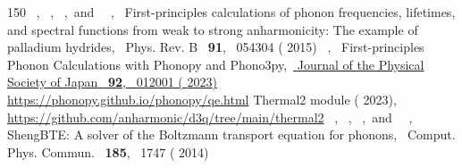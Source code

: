 \documentclass[
prb,
twocolumn,
superscriptaddress,
 amsmath,amssymb,
 aps,
longbibliography,
]{revtex4-2}
\begin{document}
\begin{thebibliography}{150}
  \BibitemOpen
   { {~},  {~},  {~},\ and\  {~},\ } { {First-principles calculations of phonon frequencies, lifetimes, and spectral functions from weak to strong anharmonicity: The example of palladium hydrides},\ }\href@noop {} { { {Phys. Rev. B}\ }\textbf { {91}},\  {054304} ( {2015})}
  \BibitemOpen
   { {~},\ } { {First-principles {Phonon} {Calculations} with {Phonopy} and {Phono3py}},\ }\href {https://doi.org/10.7566/JPSJ.92.012001} { { {Journal of the Physical Society of Japan}\ }\textbf { {92}},\  {012001} ( {2023})}
  \BibitemOpen
  \href@noop {} {} {\url{https://phonopy.github.io/phonopy/qe.html}}
  \BibitemOpen
  \href@noop {} { {Thermal2 module}} ( {2023}),\  {\url{https://github.com/anharmonic/d3q/tree/main/thermal2}}
  \BibitemOpen
   { {~},  {~},  {\ },\ and\  {~},\ } { {{ShengBTE: A solver of the Boltzmann transport equation for phonons}},\ }\href@noop {} { { {Comput. Phys. Commun.}\ }\textbf { {185}},\  {1747 } ( {2014})}
  \BibitemOpen

\end{thebibliography}
\end{document}
